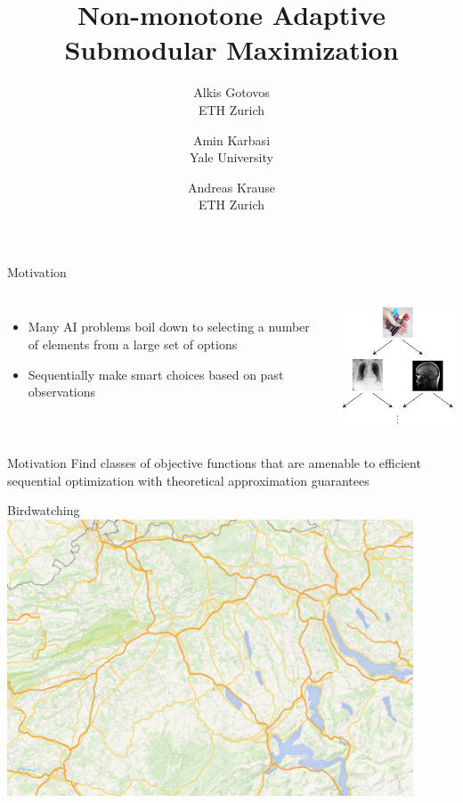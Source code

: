 \documentclass[xetex,10pt,mathserif]{beamer}
\title[Non-monotone Adaptive Submodular Maximization]
{Non-monotone Adaptive Submodular Maximization}
\author[Alkis Gotovos]{
\vspace{1in}
\normalsize
\parbox{1in}{Alkis Gotovos\\{\footnotesize ETH Zurich}}\and
\parbox{1in}{Amin Karbasi\\{\footnotesize Yale University}}\and
\parbox{1in}{Andreas Krause\\{\footnotesize ETH Zurich}}
}
\date[May 4, 2015]{
\begin{center}
{\normalsize
ICML '15
}
\end{center}
}
\begin{document}


\begin{frame}{Motivation}
\begin{columns}[c]
\begin{itemize}
\item Many AI problems boil down to selecting a number of elements from a large set of options
\vspace{3em}
\item Sequentially make smart choices based on past observations
\end{itemize}
\centering
\includegraphics[width=2.3in]{figures/diagnosis.pdf}
\end{columns}
\end{frame}

\begin{frame}{Motivation}
\large{Find classes of objective functions that are amenable to efficient sequential optimization with theoretical approximation guarantees}
\end{frame}

\begin{frame}{Birdwatching}
\centering
\includegraphics[width=4.75in]{figures/map.pdf}
\end{frame}
\end{document}
